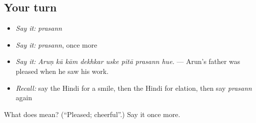\subsection*{Your turn}
\begin{itemize}
\raggedright
  \item \emph{Say it:} \emph{prasann}
  \item \emph{Say it:} \emph{prasann}, once more
  \item \emph{Say it:} \emph{Aruṇ kā kām dekhkar uske pitā prasann hue.} — Arun's father was pleased when he saw his work.
  \item \emph{Recall:} say the Hindi for a smile, then the Hindi for elation, then say \emph{prasann} again
\end{itemize}

\begin{tcolorbox}[breakable,colback=teal!4,colframe=teal!35!black,title={Before you move on}]
What does  mean? (\textquotedblleft{}Pleased; cheerful\textquotedblright{}.) Say it once more.
\end{tcolorbox}
